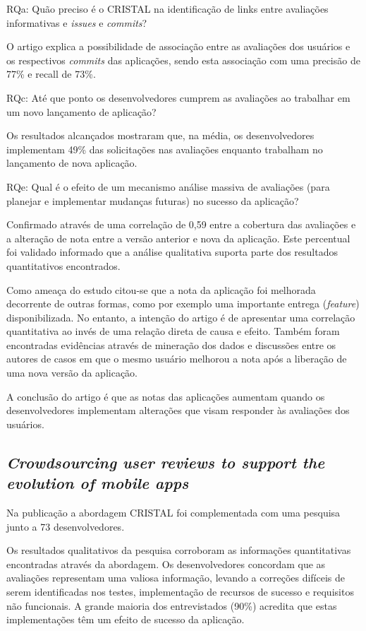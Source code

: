 RQa: Quão preciso é o CRISTAL na identificação de links entre avaliações informativas e \textit{issues} e \textit{commits}?

O artigo explica a possibilidade de associação entre as avaliações dos usuários e os respectivos \textit{commits} das aplicações, sendo esta associação com uma precisão de 77\% e recall de 73\%.

RQc: Até que ponto os desenvolvedores cumprem as avaliações ao trabalhar em um novo lançamento de aplicação?

Os resultados alcançados mostraram que, na média, os desenvolvedores implementam 49\% das solicitações nas avaliações enquanto trabalham no lançamento de nova aplicação.

RQe: Qual é o efeito de um mecanismo análise massiva de avaliações (para planejar e implementar mudanças futuras) no sucesso da aplicação?

Confirmado através de uma correlação de 0,59 entre a cobertura das avaliações e a alteração de nota entre a versão anterior e nova da aplicação. Este percentual foi validado informado que a análise qualitativa suporta parte dos resultados quantitativos encontrados.

Como ameaça do estudo citou-se que a nota da aplicação foi melhorada decorrente de outras formas, como por exemplo uma importante entrega (\textit{feature}) disponibilizada. No entanto, a intenção do artigo é de apresentar uma correlação quantitativa ao invés de uma relação direta de causa e efeito. Também foram encontradas evidências através de mineração dos dados e discussões entre os autores de casos em que o mesmo usuário melhorou a nota após a liberação de uma nova versão da aplicação.

A conclusão do artigo é que as notas das aplicações aumentam quando os desenvolvedores implementam alterações que visam responder às avaliações dos usuários.

\subsection{\textit{Crowdsourcing user reviews to support the evolution of mobile apps}}
Na publicação \cite{Palomba2018crowdsourcing} a abordagem CRISTAL foi complementada com uma pesquisa junto a 73 desenvolvedores.

Os resultados qualitativos da pesquisa corroboram as informações quantitativas encontradas através da abordagem. Os desenvolvedores concordam que as avaliações representam uma valiosa informação, levando a correções difíceis de serem identificadas nos testes, implementação de recursos de sucesso e requisitos não funcionais. A grande maioria dos entrevistados (90\%) acredita que estas implementações têm um efeito de sucesso da aplicação.

